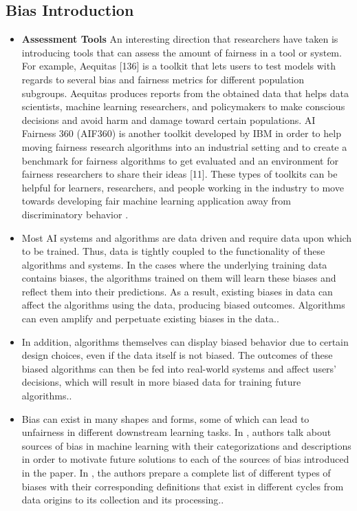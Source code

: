 \begin{refsection}
					\rawcitationstart
		\subsection{Bias Introduction}
		\begin{itemize}
			\item \textbf{Assessment Tools} An interesting direction that researchers have taken is introducing tools that can assess the amount of fairness in a tool or system. For example, Aequitas [136] is a toolkit that lets users to test models with regards to several bias and fairness metrics for different population subgroups. Aequitas produces reports from the obtained data that helps data scientists, machine learning researchers, and policymakers to make conscious decisions and avoid harm and damage toward certain populations. \gls{AI} Fairness 360 (AIF360) is another toolkit developed by IBM in order to help moving fairness research algorithms into an industrial setting and to create a benchmark for fairness algorithms to get evaluated and an environment for fairness researchers to share their ideas [11]. These types of toolkits can be helpful for learners, researchers, and people working in the industry to move towards developing fair machine learning application away from discriminatory behavior \autocite{Mehrabi_2021}.
		\end{itemize}	
		
		\begin{itemize}
			\item Most \gls{AI} systems and algorithms are data driven and require data upon which to be trained. Thus, data is tightly coupled to the functionality of these algorithms and systems. In the cases where the underlying training data contains biases, the algorithms trained on them will learn these biases and reflect them into their predictions. As a result, existing biases in data can affect the algorithms using the data, producing biased outcomes. Algorithms can even amplify and perpetuate existing biases in the data.\autocite{Mehrabi_2021}.
			\item In addition, algorithms themselves can display biased behavior due to certain design choices, even if the data itself is not biased. The outcomes of these biased algorithms can then be fed into real-world systems and affect users’ decisions, which will result in more biased data for training future algorithms.\autocite{Mehrabi_2021}.
			
			\item Bias can exist in many shapes and forms, some of which can lead to unfairness in different downstream learning tasks. In \autocite{M144_Suresh_2021}, authors talk about sources of bias in machine learning with their categorizations and descriptions in order to motivate future solutions to each of the sources of bias introduced in the paper. In \autocite{M120_Olteanu_2019}, the authors prepare a complete list of different types of biases with their corresponding definitions that exist in different cycles from data origins to its collection and its processing.\autocite{Mehrabi_2021}.
		\end{itemize}	
		

\end{refsection}
